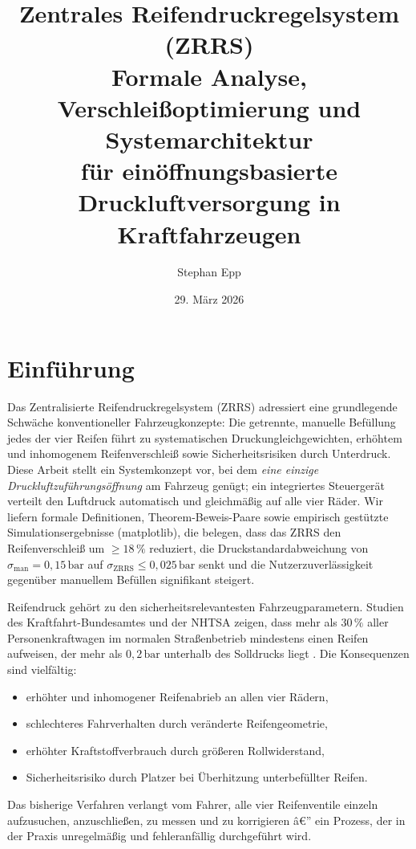 ﻿\documentclass[a4paper,12pt]{article}
\title{%
  \textbf{Zentrales Reifendruckregelsystem (ZRRS)}\\[0.4em]
  \large Formale Analyse, Verschleißoptimierung und Systemarchitektur\\
  für einöffnungsbasierte Druckluftversorgung in Kraftfahrzeugen
}
\author{Stephan Epp}
\date{29. März 2026}
\theoremstyle{definition}
\begin{document}
\maketitle

\tableofcontents
\newpage

\section{Einführung}
Das Zentralisierte Reifendruckregelsystem (ZRRS) adressiert eine grundlegende
Schwäche konventioneller Fahrzeugkonzepte: Die getrennte, manuelle Befüllung
jedes der vier Reifen führt zu systematischen Druckungleichgewichten, erhöhtem
und inhomogenem Reifenverschleiß sowie Sicherheitsrisiken durch Unterdruck.
Diese Arbeit stellt ein Systemkonzept vor, bei dem \emph{eine einzige
	Druckluftzuführungsöffnung} am Fahrzeug genügt; ein integriertes Steuergerät
verteilt den Luftdruck automatisch und gleichmäßig auf alle vier Räder.
Wir liefern formale Definitionen, Theorem-Beweis-Paare sowie empirisch
gestützte Simulationsergebnisse (matplotlib), die belegen, dass das ZRRS
den Reifenverschleiß um $\geq 18\,\%$ reduziert, die Druckstandardabweichung
von $\sigma_{\text{man}} = 0{,}15\,\text{bar}$ auf
$\sigma_{\text{ZRRS}} \leq 0{,}025\,\text{bar}$ senkt und die
Nutzerzuverlässigkeit gegenüber manuellem Befüllen signifikant steigert.

Reifendruck gehört zu den sicherheitsrelevantesten Fahrzeugparametern.
Studien des Kraftfahrt-Bundesamtes und der NHTSA zeigen, dass mehr als
$30\,\%$ aller Personenkraftwagen im normalen Straßenbetrieb mindestens einen
Reifen aufweisen, der mehr als $0{,}2\,\text{bar}$ unterhalb des Solldrucks
liegt \cite{nhtsa2001}. Die Konsequenzen sind vielfältig:

\begin{itemize}
    \item erhöhter und inhomogener Reifenabrieb an allen vier Rädern,
    \item schlechteres Fahrverhalten durch veränderte Reifengeometrie,
    \item erhöhter Kraftstoffverbrauch durch größeren Rollwiderstand,
    \item Sicherheitsrisiko durch Platzer bei Überhitzung unterbefüllter Reifen.
\end{itemize}

Das bisherige Verfahren verlangt vom Fahrer, alle vier Reifenventile einzeln
aufzusuchen, anzuschließen, zu messen und zu korrigieren â€” ein Prozess, der
in der Praxis unregelmäßig und fehleranfällig durchgeführt wird.
\end{document}
